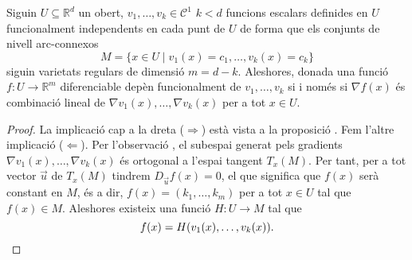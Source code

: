 \documentclass[../Apunts.tex]{subfiles}
\begin{document}
	\begin{proposition}Siguin \(U\subseteq\mathbb{R}^{d}\) un obert, \(v_{1},\dots,v_{k}\in\mathcal{C}^{1}\) \(k<d\) funcions escalars definides en \(U\) funcionalment independents en cada punt de \(U\) de forma que els conjunts de nivell arc-connexos
		\[M=\{x\in U\mid v_{1}(x)=c_{1},\dots,v_{k}(x)=c_{k}\}\]
		siguin varietats regulars de dimensió \(m=d-k\). Aleshores, donada una funció \(f\colon U\to\mathbb{R}^{m}\) diferenciable depèn funcionalment de \(v_{1},\dots,v_{k}\) si i només si \(\nabla f(x)\) és combinació lineal de \(\nabla v_{1}(x),\dots,\nabla v_{k}(x)\) per a tot \(x\in U\).
		\begin{proof}
			La implicació cap a la dreta (\(\Rightarrow\)) està vista a la proposició . Fem l'altre implicació (\(\Leftarrow\)).
			Per l'observació , el subespai generat pels gradients \(\nabla v_{1}(x),\dots,\nabla v_{k}(x)\) és ortogonal a l'espai tangent \(T_{x}(M)\). Per tant, per a tot vector \(\vec{u}\) de \(T_{x}(M)\) tindrem \(D_{\vec{u}}f(x)=0\), el que significa que \(f(x)\) serà constant en \(M\), és a dir, \(f(x)=(k_{1},\dots,k_{m})\) per a tot \(x\in U\) tal que \(f(x)\in M\). Aleshores existeix una funció \(H\colon U\rightarrow M\) tal que
			\[f(x)=H(v_{1}(x),\dots,v_{k}(x)).\qedhere\]
		\end{proof}
	\end{proposition}
\end{document}
